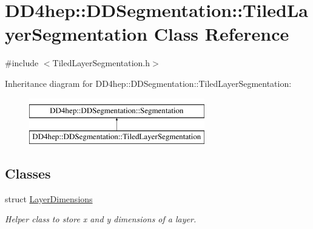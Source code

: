 \hypertarget{class_d_d4hep_1_1_d_d_segmentation_1_1_tiled_layer_segmentation}{}\section{D\+D4hep\+:\+:D\+D\+Segmentation\+:\+:Tiled\+Layer\+Segmentation Class Reference}
\label{class_d_d4hep_1_1_d_d_segmentation_1_1_tiled_layer_segmentation}


{\ttfamily \#include $<$Tiled\+Layer\+Segmentation.\+h$>$}

Inheritance diagram for D\+D4hep\+:\+:D\+D\+Segmentation\+:\+:Tiled\+Layer\+Segmentation\+:\begin{figure}[H]
\begin{center}
\leavevmode
\includegraphics[height=2.000000cm]{class_d_d4hep_1_1_d_d_segmentation_1_1_tiled_layer_segmentation}
\end{center}
\end{figure}
\subsection*{Classes}
\begin{DoxyCompactItemize}
\item 
struct \hyperlink{struct_d_d4hep_1_1_d_d_segmentation_1_1_tiled_layer_segmentation_1_1_layer_dimensions}{Layer\+Dimensions}
\begin{DoxyCompactList}\small\item\em Helper class to store x and y dimensions of a layer. \end{DoxyCompactList}\end{DoxyCompactItemize}
